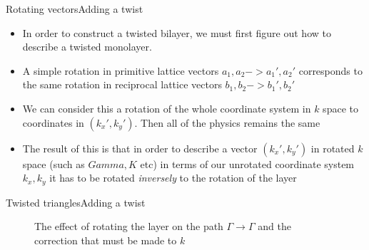 \documentclass[9pt]{beamer}
\begin{document}
\begin{frame}{Rotating vectors}{Adding a twist}
  \begin{itemize}
    \item In order to construct a twisted bilayer, we must first figure out how to describe a twisted monolayer.

    \item A simple rotation in primitive lattice vectors $a_1, a_2 -> a_1', a_2'$ corresponds to the same rotation in reciprocal lattice vectors $b_1, b_2 -> b_1', b_2'$

    \item We can consider this a rotation of the whole coordinate system in $k$ space to coordinates in $(k_x', k_y')$. Then all of the physics remains the same

    \item The result of this is that in order to describe a vector $(k_x', k_y')$ in rotated $k$ space (such as $Gamma, K$ etc) in terms of our unrotated coordinate system $k_x, k_y$ it has to be rotated \textit{inversely} to the rotation of the layer
  \end{itemize}
\end{frame}

\begin{frame}{Twisted triangles}{Adding a twist}
  \begin{figure}
  \centering
    \caption{The effect of rotating the layer on the path $\Gamma \rightarrow \Gamma$ and the correction that must be made to $k$}
  \end{figure}
\end{frame}
\end{document}
